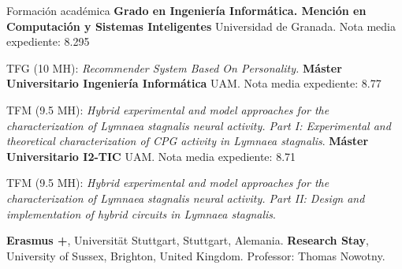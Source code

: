\begin{rubric}{Formación académica}
	\entry*[2014 -- 2018]%
	\textbf{Grado en Ingeniería Informática. Mención en Computación y Sistemas Inteligentes} Universidad de Granada. Nota media expediente: 8.295
	 \par TFG (10 MH): \emph{Recommender System Based On Personality.} 
	\entry*[2018 -- 2019]%
	\textbf{Máster Universitario Ingeniería Informática} UAM. Nota media expediente: 8.77\par
	 TFM (9.5 MH): \emph{Hybrid experimental and model approaches for the characterization of \textit{Lymnaea stagnalis} neural activity. Part I: Experimental and theoretical characterization of CPG activity in \textit{Lymnaea stagnalis}}.
	\vspace{-3pt}
	\entry*[2018 -- 2019]%
	\textbf{Máster Universitario I2-TIC} UAM. Nota media expediente: 8.71\par
	 TFM (9.5 MH): \emph{Hybrid experimental and model approaches for the characterization of \textit{Lymnaea stagnalis} neural activity. Part II: Design and implementation of hybrid circuits in \textit{Lymnaea stagnalis}}.
	
	\entry*[Curso 2016-2017] \textbf{Erasmus +}, Universität Stuttgart, Stuttgart, Alemania.
	 \textbf{Research Stay}, University of Sussex, Brighton, United Kingdom. Professor: Thomas Nowotny.
	
\end{rubric}
